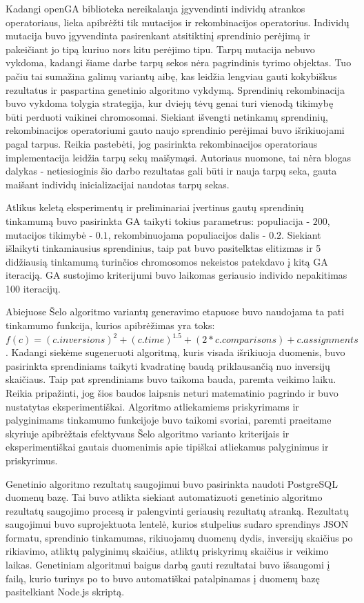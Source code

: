 \documentclass{VUMIFInfKursinis}
\begin{document}
Kadangi openGA biblioteka nereikalauja įgyvendinti individų atrankos operatoriaus, lieka apibrėžti tik mutacijos ir rekombinacijos operatorius.
Individų mutacija buvo įgyvendinta pasirenkant atsitiktinį sprendinio perėjimą ir pakeičiant jo tipą kuriuo nors kitu perėjimo tipu.
Tarpų mutacija nebuvo vykdoma, kadangi šiame darbe tarpų sekos nėra pagrindinis tyrimo objektas.
Tuo pačiu tai sumažina galimų variantų aibę, kas leidžia lengviau gauti kokybiškus rezultatus ir paspartina genetinio algoritmo vykdymą.
Sprendinių rekombinacija buvo vykdoma tolygia strategija, kur dviejų tėvų genai turi vienodą tikimybę
būti perduoti vaikinei chromosomai.
Siekiant išvengti netinkamų sprendinių, rekombinacijos operatoriumi gauto naujo sprendinio perėjimai buvo išrikiuojami pagal tarpus.
Reikia pastebėti, jog pasirinkta rekombinacijos operatoriaus implementacija leidžia tarpų sekų maišymąsi.
Autoriaus nuomone, tai nėra blogas dalykas - netiesioginis šio darbo rezultatas gali būti ir nauja tarpų seka, gauta maišant
individų inicializacijai naudotas tarpų sekas.

Atlikus keletą eksperimentų ir preliminariai įvertinus gautų sprendinių tinkamumą buvo pasirinkta GA taikyti tokius parametrus:
populiacija - $200$, mutacijos tikimybė - $0.1$, rekombinuojama populiacijos dalis - $0.2$.
Siekiant išlaikyti tinkamiausius sprendinius, taip pat buvo pasitelktas elitizmas ir 5 didžiausią tinkamumą turinčios chromosomos nekeistos patekdavo į kitą GA iteraciją.
GA sustojimo kriterijumi buvo laikomas geriausio individo nepakitimas 100 iteracijų.

Abiejuose Šelo algoritmo variantų generavimo etapuose buvo naudojama ta pati tinkamumo funkcija, kurios apibrėžimas yra toks:
\\${f(c) = (c.inversions)^2 + (c.time)^{1.5} + (2*c.comparisons) + c.assignments}$.
Kadangi siekėme sugeneruoti algoritmą, kuris visada išrikiuoja duomenis, buvo pasirinkta sprendiniams taikyti kvadratinę baudą priklausančią nuo inversijų skaičiaus.
Taip pat sprendiniams buvo taikoma bauda, paremta veikimo laiku. Reikia pripažinti, jog šios baudos laipsnis neturi matematinio pagrindo ir buvo nustatytas eksperimentiškai.
Algoritmo atliekamiems priskyrimams ir palyginimams tinkamumo funkcijoje buvo taikomi svoriai, paremti
praeitame skyriuje apibrėžtais efektyvaus Šelo algoritmo varianto kriterijais ir eksperimentiškai gautais duomenimis apie tipiškai atliekamus palyginimus ir priskyrimus.

Genetinio algoritmo rezultatų saugojimui buvo pasirinkta naudoti PostgreSQL duomenų bazę.
Tai buvo atlikta siekiant automatizuoti genetinio algoritmo rezultatų saugojimo procesą ir palengvinti geriausių rezultatų atranką.
Rezultatų saugojimui buvo suprojektuota lentelė, kurios stulpelius sudaro sprendinys JSON formatu, sprendinio tinkamumas, rikiuojamų duomenų dydis,
inversijų skaičius po rikiavimo, atliktų palyginimų skaičius, atliktų priskyrimų skaičius ir veikimo laikas.  
Genetiniam algoritmui baigus darbą gauti rezultatai buvo išsaugomi į failą, kurio turinys po to buvo automatiškai patalpinamas į duomenų bazę pasitelkiant Node.js skriptą.
\end{document}
